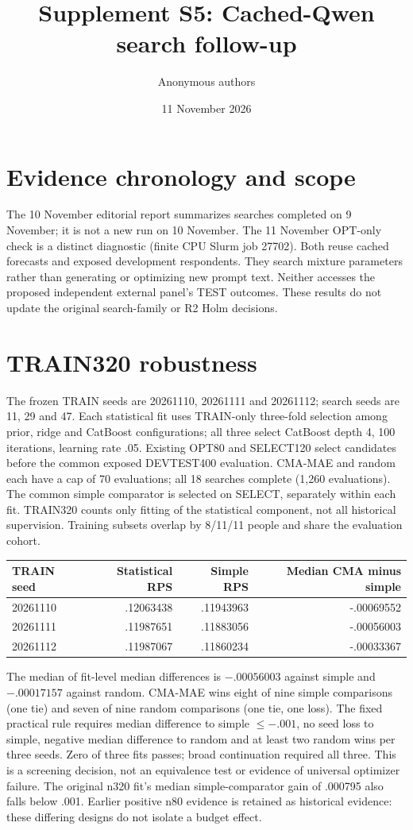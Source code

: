 \documentclass[10pt]{article}
\title{Supplement S5: Cached-Qwen search follow-up}\author{Anonymous authors}\date{11 November 2026}
\begin{document}
\maketitle
\section{Evidence chronology and scope}
The 10 November editorial report summarizes searches completed on 9 November; it is not a new run on 10 November. The 11 November OPT-only check is a distinct diagnostic (finite CPU Slurm job 27702). Both reuse cached forecasts and exposed development respondents. They search mixture parameters rather than generating or optimizing new prompt text. Neither accesses the proposed independent external panel's TEST outcomes. These results do not update the original search-family or R2 Holm decisions.
\section{TRAIN320 robustness}
The frozen TRAIN seeds are 20261110, 20261111 and 20261112; search seeds are 11, 29 and 47. Each statistical fit uses TRAIN-only three-fold selection among prior, ridge and CatBoost configurations; all three select CatBoost depth 4, 100 iterations, learning rate .05. Existing OPT80 and SELECT120 select candidates before the common exposed DEVTEST400 evaluation. CMA-MAE and random each have a cap of 70 evaluations; all 18 searches complete (1,260 evaluations). The common simple comparator is selected on SELECT, separately within each fit. TRAIN320 counts only fitting of the statistical component, not all historical supervision. Training subsets overlap by 8/11/11 people and share the evaluation cohort.
\begin{center}\begin{tabular}{lrrr}\toprule
TRAIN seed & Statistical RPS & Simple RPS & Median CMA minus simple\\\midrule
20261110 & .12063438 & .11943963 & -.00069552\\
20261111 & .11987651 & .11883056 & -.00056003\\
20261112 & .11987067 & .11860234 & -.00033367\\\bottomrule
\end{tabular}\end{center}
The median of fit-level median differences is $-.00056003$ against simple and $-.00017157$ against random. CMA-MAE wins eight of nine simple comparisons (one tie) and seven of nine random comparisons (one tie, one loss). The fixed practical rule requires median difference to simple $\leq-.001$, no seed loss to simple, negative median difference to random and at least two random wins per three seeds. Zero of three fits passes; broad continuation required all three. This is a screening decision, not an equivalence test or evidence of universal optimizer failure. The original n320 fit's median simple-comparator gain of .000795 also falls below .001. Earlier positive n80 evidence is retained as historical evidence: these differing designs do not isolate a budget effect.
\end{document}
